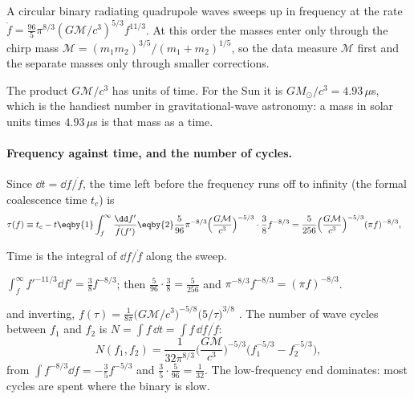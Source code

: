 \begin{keyidea}
A circular binary radiating quadrupole waves sweeps up in frequency at the rate
$\dot f=\frac{96}{5}\pi^{8/3}(G\mathcal M/c^3)^{5/3}f^{11/3}$. At this order the masses enter only through the chirp mass $\mathcal M=(m_1m_2)^{3/5}/(m_1+m_2)^{1/5}$, so the data measure $\mathcal M$ first and the separate masses only through smaller corrections.
\end{keyidea}

The product $G\mathcal M/c^3$ has units of time. For the Sun it is $GM_\odot/c^3=4.93\,\mu$s, which is the handiest number in gravitational-wave astronomy: a mass in solar units times $4.93\,\mu$s is that mass as a time.

\paragraph{Frequency against time, and the number of cycles.}
Since $\dd t=\dd f/\dot f$, the time left before the frequency runs off to infinity (the formal coalescence time $t_c$) is
\begin{align}
  \tau(f)\equiv t_c-t
  &\eqby{1}\int_f^\infty\frac{\dd f'}{\dot f(f')}
  \eqby{2}\frac{5}{96}\pi^{-8/3}\Big(\frac{G\mathcal M}{c^3}\Big)^{-5/3}\cdot\frac38 f^{-8/3}
  =\frac{5}{256}\Big(\frac{G\mathcal M}{c^3}\Big)^{-5/3}(\pi f)^{-8/3},\label{T2a:eq:tau}
\end{align}
\begin{explain}
  \item Time is the integral of $\dd f/\dot f$ along the sweep.
  \item $\int_f^\infty f'^{-11/3}\dd f'=\tfrac38 f^{-8/3}$; then $\tfrac{5}{96}\cdot\tfrac38=\tfrac{5}{256}$ and $\pi^{-8/3}f^{-8/3}=(\pi f)^{-8/3}$.
\end{explain}
and inverting, $f(\tau)=\frac{1}{8\pi}\big(G\mathcal M/c^3\big)^{-5/8}\big(5/\tau\big)^{3/8}$ \cite[eq.~(24)]{Robson2019}. The number of wave cycles between $f_1$ and $f_2$ is $N=\int f\,\dd t=\int f\,\dd f/\dot f$:
\begin{equation}
  N(f_1,f_2)=\frac{1}{32\pi^{8/3}}\Big(\frac{G\mathcal M}{c^3}\Big)^{-5/3}\big(f_1^{-5/3}-f_2^{-5/3}\big),
  \label{T2a:eq:Ncyc}
\end{equation}
from $\int f^{-8/3}\dd f=-\tfrac35f^{-5/3}$ and $\tfrac35\cdot\tfrac{5}{96}=\tfrac1{32}$. The low-frequency end dominates: most cycles are spent where the binary is slow.

